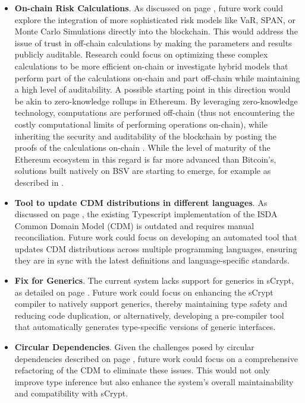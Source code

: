 \begin{itemize}
    \item \textbf{On-chain Risk Calculations}. As discussed on page \pageref{item:risk_calc}, future work could explore the integration of more sophisticated risk models like VaR, SPAN, or Monte Carlo Simulations directly into the blockchain. This would address the issue of trust in off-chain calculations by making the parameters and results publicly auditable. Research could focus on optimizing these complex calculations to be more efficient on-chain or investigate hybrid models that perform part of the calculations on-chain and part off-chain while maintaining a high level of auditability. A possible starting point in this direction would be akin to zero-knowledge rollups in Ethereum. By leveraging zero-knowledge technology, computations are performed off-chain (thus not encountering the costly computational limits of performing operations on-chain), while inheriting the security and auditability of the blockchain by posting the proofs of the calculations on-chain \citep{rollups}. While the level of maturity of the Ethereum ecosystem in this regard is far more advanced than Bitcoin's, solutions built natively on BSV are starting to emerge, for example as described in \cite{rollups_bsv}. 

    \item \textbf{Tool to update CDM distributions in different languages}. As discussed on page \pageref{cdm_tool}, the existing Typescript implementation of the ISDA Common Domain Model (CDM) is outdated and requires manual reconciliation. Future work could focus on developing an automated tool that updates CDM distributions across multiple programming languages, ensuring they are in sync with the latest definitions and language-specific standards.

    \item \textbf{Fix for Generics}. The current system lacks support for generics in sCrypt, as detailed on page \pageref{item:generics}. Future work could focus on enhancing the sCrypt compiler to natively support generics, thereby maintaining type safety and reducing code duplication, or alternatively, developing a pre-compiler tool that automatically generates type-specific versions of generic interfaces.
    
    \item \textbf{Circular Dependencies}. Given the challenges posed by circular dependencies described on page \pageref{item:circular_deps}, future work could focus on a comprehensive refactoring of the CDM to eliminate these issues. This would not only improve type inference but also enhance the system's overall maintainability and compatibility with sCrypt.
    
\end{itemize}